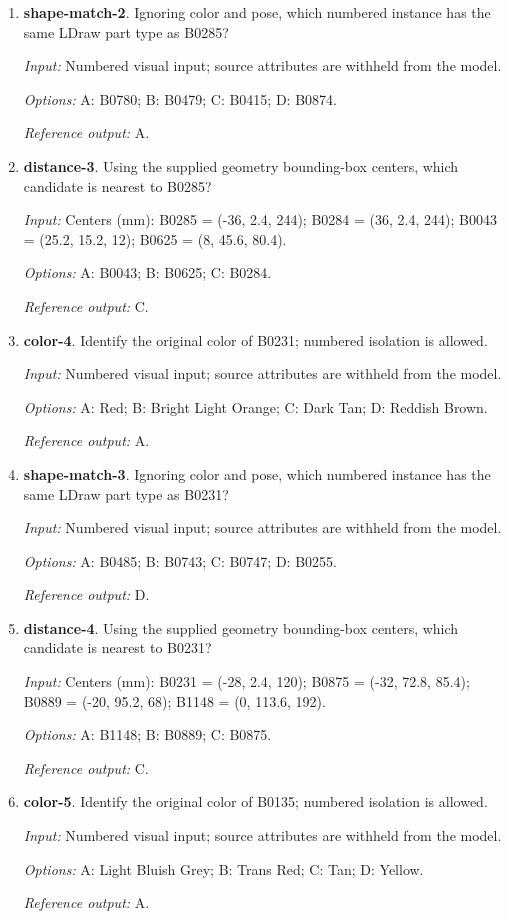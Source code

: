 \begin{enumerate}
\item \textbf{shape-match-2}. Ignoring color and pose, which numbered instance has the same LDraw part type as B0285?\par {\small \textit{Input:} Numbered visual input; source attributes are withheld from the model. \par\textit{Options:} A: B0780; B: B0479; C: B0415; D: B0874. \par\textit{Reference output:} A.}
\item \textbf{distance-3}. Using the supplied geometry bounding-box centers, which candidate is nearest to B0285?\par {\small \textit{Input:} Centers (mm): B0285 = (-36, 2.4, 244); B0284 = (36, 2.4, 244); B0043 = (25.2, 15.2, 12); B0625 = (8, 45.6, 80.4). \par\textit{Options:} A: B0043; B: B0625; C: B0284. \par\textit{Reference output:} C.}
\item \textbf{color-4}. Identify the original color of B0231; numbered isolation is allowed.\par {\small \textit{Input:} Numbered visual input; source attributes are withheld from the model. \par\textit{Options:} A: Red; B: Bright Light Orange; C: Dark Tan; D: Reddish Brown. \par\textit{Reference output:} A.}
\item \textbf{shape-match-3}. Ignoring color and pose, which numbered instance has the same LDraw part type as B0231?\par {\small \textit{Input:} Numbered visual input; source attributes are withheld from the model. \par\textit{Options:} A: B0485; B: B0743; C: B0747; D: B0255. \par\textit{Reference output:} D.}
\item \textbf{distance-4}. Using the supplied geometry bounding-box centers, which candidate is nearest to B0231?\par {\small \textit{Input:} Centers (mm): B0231 = (-28, 2.4, 120); B0875 = (-32, 72.8, 85.4); B0889 = (-20, 95.2, 68); B1148 = (0, 113.6, 192). \par\textit{Options:} A: B1148; B: B0889; C: B0875. \par\textit{Reference output:} C.}
\item \textbf{color-5}. Identify the original color of B0135; numbered isolation is allowed.\par {\small \textit{Input:} Numbered visual input; source attributes are withheld from the model. \par\textit{Options:} A: Light Bluish Grey; B: Trans Red; C: Tan; D: Yellow. \par\textit{Reference output:} A.}

\end{enumerate}

